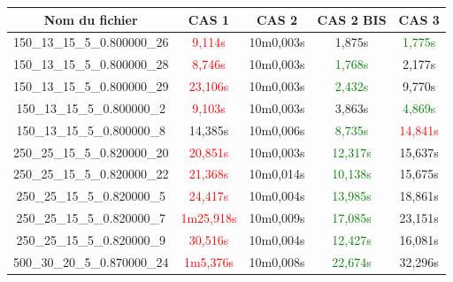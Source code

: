 \documentclass[a4paper, 10pt]{article}
\begin{document}
      \begin{minipage}[t]{0.5\linewidth}
        \footnotesize
        \begin{tabular}{ |c|c|c|c|c| }
          \hline
          \textbf{Nom du fichier} & \textbf{CAS 1} & \textcolor[gray]{0.6}{\textbf{CAS 2}}   & \textbf{CAS 2 BIS} & \textbf{CAS 3} \\
          \hline
          \scriptsize{150\_13\_15\_5\_0.800000\_26} & \textcolor{red}{9,114s} & \textcolor[gray]{0.6}{ 10m0,003s} & 1,875s& \textcolor{green}{1,775s}\\
          \hline
          \scriptsize{150\_13\_15\_5\_0.800000\_28} & \textcolor{red}{8,746s} & \textcolor[gray]{0.6}{ 10m0,003s} & \textcolor{green}{1,768s} & 2,177s \\
          \hline
          \scriptsize{150\_13\_15\_5\_0.800000\_29} &\textcolor{red}{ 23,106s} & \textcolor[gray]{0.6}{ 10m0,003s} & \textcolor{green}{2,432s} & 9,770s \\
          \hline
          \scriptsize{150\_13\_15\_5\_0.800000\_2} & \textcolor{red}{9,103s} & \textcolor[gray]{0.6}{ 10m0,003s} & 3,863s & \textcolor{green}{4,869s} \\
          \hline
          \scriptsize{150\_13\_15\_5\_0.800000\_8} & 14,385s & \textcolor[gray]{0.6}{ 10m0,006s} & \textcolor{green}{8,735s} & \textcolor{red}{14,841s}\\
          \hline
          \scriptsize{250\_25\_15\_5\_0.820000\_20} & \textcolor{red}{20,851s} & \textcolor[gray]{0.6}{ 10m0,003s} & \textcolor{green}{12,317s} & 15,637s \\
          \hline
          \scriptsize{250\_25\_15\_5\_0.820000\_22} &\textcolor{red}{ 21,368s} & \textcolor[gray]{0.6}{ 10m0,014s} & \textcolor{green}{10,138s} & 15,675s \\
          \hline
          \scriptsize{250\_25\_15\_5\_0.820000\_5} & \textcolor{red}{24,417s} & \textcolor[gray]{0.6}{ 10m0,004s} & \textcolor{green}{13,985s} & 18,861s \\
          \hline
          \scriptsize{250\_25\_15\_5\_0.820000\_7} & \textcolor{red}{1m25,918s} & \textcolor[gray]{0.6}{ 10m0,009s} & \textcolor{green}{17,085s} & 23,151s \\
          \hline
          \scriptsize{250\_25\_15\_5\_0.820000\_9} & \textcolor{red}{30,516s} & \textcolor[gray]{0.6}{ 10m0,004s} & \textcolor{green}{12,427s} & 16,081s\\
          \hline
          \scriptsize{500\_30\_20\_5\_0.870000\_24} & \textcolor{red}{1m5,376s} & \textcolor[gray]{0.6}{ 10m0,008s} & \textcolor{green}{22,674s} & 32,296s \\

\end{tabular}
\end{minipage}
\end{document}
